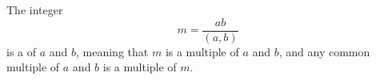 The integer
$$m = \frac{ab}{(a,b)}$$
is a  of $a$ and $b$, meaning that $m$ is a multiple of $a$ and $b$, and any common multiple of $a$ and $b$ is a multiple of $m$.
